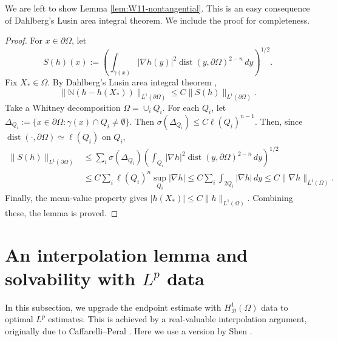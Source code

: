 \documentclass[12pt]{amsart}
\numberwithin{equation}{section}
\newcommand\cD{\mathcal{D}}
\newcommand\dist{\operatorname{dist}}
\newcommand{\p}{\partial}
\begin{document}
We are left to show Lemma \ref{lem:W11-nontangential}. This is an easy consequence of Dahlberg's Lusin area integral theorem. We include the proof for completeness.
\begin{proof}
 For $x\in\p\Omega$, let
 \[
  S(h)(x):=
  \left(
   \int_{\gamma(x)}|\nabla h(y)|^2
   \dist(y,\p\Omega)^{2-n}\,dy
  \right)^{1/2}.
 \]
 Fix $X_* \in \Omega$.
 By Dahlberg's Lusin area integral theorem
 \cite[Theorem~1]{Dahlberg1980},
 \begin{equation}
  \|\mathbb{N}(h-h(X_*))\|_{L^1(\p\Omega)}
  \leq C\|S(h)\|_{L^1(\p\Omega)}.
  \label{eq:Dahlberg-area}
 \end{equation}
Take a Whitney decomposition $\Omega = \cup_i Q_i$. For each $Q_i$, let $\Delta_{Q_i}:= \{x\in\p\Omega:\gamma(x)\cap Q_i\neq\emptyset\}$. Then $\sigma(\Delta_{Q_i})\leq C\ell(Q_i)^{n-1}$. Then, since $\dist(\cdot,\p\Omega)\simeq\ell(Q_i)$ on $Q_i$,
 \begin{align*}
  \|S(h)\|_{L^1(\p\Omega)}
  &\leq
  \sum_i \sigma(\Delta_{Q_i})
  \left(
   \int_{Q_i}|\nabla h|^2
   \dist(y,\p\Omega)^{2-n}\,dy
  \right)^{1/2}
  \\
  &\leq
  C\sum_i \ell(Q_i)^n\sup_{Q_i}|\nabla h|
  \leq
  C\sum_i\int_{2 Q_i}|\nabla h|\,dy
  \leq C\|\nabla h\|_{L^1(\Omega)}.
 \end{align*}
Finally, the mean-value property gives $|h(X_*)|\leq C\|h\|_{L^1(\Omega)}$. Combining these, the lemma is proved.
\end{proof}


\section{An interpolation lemma and solvability with $L^p$ data}
\label{sec-interpolation}

In this subsection, we upgrade the endpoint estimate with $H^1_{\cD}(\Omega)$ data to optimal $L^p$ estimates.
This is achieved by a real-valuable interpolation argument, originally due to Caffarelli--Peral \cite{CaffarelliPeral1998}. Here we use a version by Shen
\cite[Theorem~3.2]{Shen2007}. 
\end{document}
